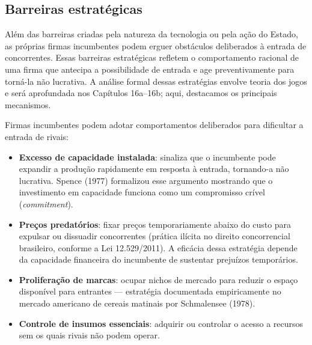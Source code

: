 \documentclass[11pt,twoside,openright]{book}
\providecommand{\tightlist}{\setlength{\itemsep}{0pt}\setlength{\parskip}{0pt}}
\begin{document}
\subsection{Barreiras estratégicas}\label{barreiras-estratuxe9gicas}

Além das barreiras criadas pela natureza da tecnologia ou pela ação do
Estado, as próprias firmas incumbentes podem erguer obstáculos
deliberados à entrada de concorrentes. Essas barreiras estratégicas
refletem o comportamento racional de uma firma que antecipa a
possibilidade de entrada e age preventivamente para torná-la não
lucrativa. A análise formal dessas estratégias envolve teoria dos jogos
e será aprofundada nos Capítulos 16a--16b; aqui, destacamos os
principais mecanismos.

Firmas incumbentes podem adotar comportamentos deliberados para
dificultar a entrada de rivais:

\begin{itemize}
\tightlist
\item
  \textbf{Excesso de capacidade instalada}: sinaliza que o incumbente
  pode expandir a produção rapidamente em resposta à entrada, tornando-a
  não lucrativa. Spence (1977) formalizou esse argumento mostrando que o
  investimento em capacidade funciona como um compromisso crível
  (\emph{commitment}).
\item
  \textbf{Preços predatórios}: fixar preços temporariamente abaixo do
  custo para expulsar ou dissuadir concorrentes (prática ilícita no
  direito concorrencial brasileiro, conforme a Lei 12.529/2011). A
  eficácia dessa estratégia depende da capacidade financeira do
  incumbente de sustentar prejuízos temporários.
\item
  \textbf{Proliferação de marcas}: ocupar nichos de mercado para reduzir
  o espaço disponível para entrantes --- estratégia documentada
  empiricamente no mercado americano de cereais matinais por Schmalensee
  (1978).
\item
  \textbf{Controle de insumos essenciais}: adquirir ou controlar o
  acesso a recursos sem os quais rivais não podem operar.
\end{itemize}
\end{document}
